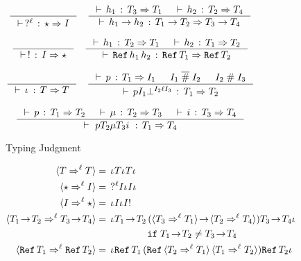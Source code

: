 \documentclass[acmtog, authorversion, acmlarge]{acmart}
\begin{document}
\begin{figure}[tbh]
\begin{subfigure}{.5\textwidth}
    \begin{gather*}
      \inference{}{\cwt{\prj{\Lbl}}{\Dyn}{\I}}
      \quad
      \inference{\cwt{\HC_1}{\T_{3}}{\T_{1}} &
                 \cwt{\HC_2}{\T_{2}}{\T_{4}}}
                {\cwt{\fn{\HC_1}{\HC_2}}
                     {\Fn{\T_{1}}{\T_{2}}}
                     {\Fn{\T_{3}}{\T_{4}}}}
      \\[2ex]
      \inference{}{\cwt{\inj}{\I}{\Dyn}}      
      \quad
      \inference{\cwt{\HC_1}{\T_{2}}{\T_{1}} &
                 \cwt{\HC_2}{\T_{1}}{\T_{2}}}
                {\cwt{\rf{\HC_1}{\HC_2}}
                     {\Ref{\T_{1}}}
                     {\Ref{\T_{2}}}}
      \\[2ex]
      \inference{}{\cwt{\id}{\T}{\T}}
      \quad          
      \inference{\cwt{\Prj}{\T_1}{\I_1} &
                 \I_1 \sct \I_2 &
                 \I_2 \sic \I_3}
                {\cwt{\hcfail{\Prj}{\I_1}{\I_2}{\Lbl}{\I_3}}{\T_1}{\T_2}}
      \\[2ex]
      \inference{\cwt{\Prj}{\T_1}{\T_2} &
                 \cwt{\Med}{\T_2}{\T_3} &
                 \cwt{\Inj}{\T_3}{\T_4}}
                {\cwt{\hc{\Prj}{\T_2}{\Med}{\T_3}{\Inj}}{\T_1}{\T_4}}
    \end{gather*}
    \caption{Typing Judgment}
    \label{fig:hcTyping}
  \end{subfigure}%
  \begin{subfigure}{.5\textwidth}
    \begin{align*}
      \mkcrcn{\T}{\T} &= \hc{\pmt}{\T}{\id}{\T}{\imt} \\
      \mkcrcn{\Dyn}{\I} &= \; \hc{\prj{\Lbl}}{\I}{\id}{\I}{\imt} \\
      \mkcrcn{\I}{\Dyn} &= \hc{\pmt}{\I}{\id}{\I}{\inj} \\
      \mkcrcn{\Fn[\!]{\T_{1}}{\T_{2}}}{\Fn[\!]{\T_{3}}{\T_{4}}} &=
         \hc{\pmt}{\Fn[\!]{\T_{1}}{\T_{2}}}
            {(\fn[\!]{\mkcrcn{\T_{3}}{\T_{1}}}{\mkcrcn{\T_{2}}{\T_{4}}})} 
            {\Fn[\!]{\T_{3}}{\T_{4}}}{\imt} \\ 
            & \hspace{5.3em} \texttt{if} \; %
            \Fn[\!]{\T_{1}}{\T_{2}} \neq \Fn[\!]{\T_{3}}{\T_{4}} \\
      \mkcrcn{\Ref{\T_1}}{\Ref{\T_2}} &=
         \hc{\pmt}{\Ref{\T_{1}}}
            {(\rf{\mkcrcn{\T_{2}}{\T_{1}}}{\mkcrcn{\T_{1}}{\T_{2}}})} 
            {\Ref{\T_{2}}}{\imt} \\

\end{align*}
\end{subfigure}
\end{figure}
\end{document}
